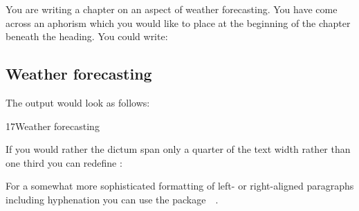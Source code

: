   \begin{Example}
    You are writing a chapter on an aspect of weather forecasting. You
    have come across an aphorism which you would like to place at the
    beginning of the chapter beneath the heading. You could write:
\begin{lstcode}
  \chapter{Weather forecasting}
\end{lstcode}
    The output would look as follows:
    \begin{ShowOutput}
      {%
        17\enskip Weather forecasting\par} \vspace{\baselineskip}
    \end{ShowOutput}

    If you would rather the dictum span only a quarter of the text width
    rather than one third you can redefine :
\begin{lstcode}
  \renewcommand*{\dictumwidth}{.25\textwidth}
\end{lstcode}
  \end{Example}

  For a somewhat more sophisticated formatting of left- or right-aligned
  paragraphs including hyphenation you can use the
  package~~\cite{package:ragged2e}.%
\fi
%
\EndIndexGroup
%
\EndIndexGroup

